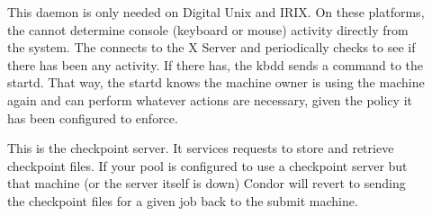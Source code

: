 \begin{description}
\item[] This daemon is only needed on Digital Unix and
IRIX.  On these platforms, the  cannot determine
console (keyboard or mouse) activity directly from the system.  The
 connects to the X Server and periodically checks to see
if there has been any activity.  If there has, the kbdd sends a
command to the startd.  That way, the startd knows the machine owner
is using the machine again and can perform whatever actions are
necessary, given the policy it has been configured to enforce.

\item[] This is the checkpoint server.  It
services requests to store and retrieve checkpoint files.  If your
pool is configured to use a checkpoint server but that machine (or the
server itself is down) Condor will revert to sending the checkpoint
files for a given job back to the submit machine.

\end{description} 

